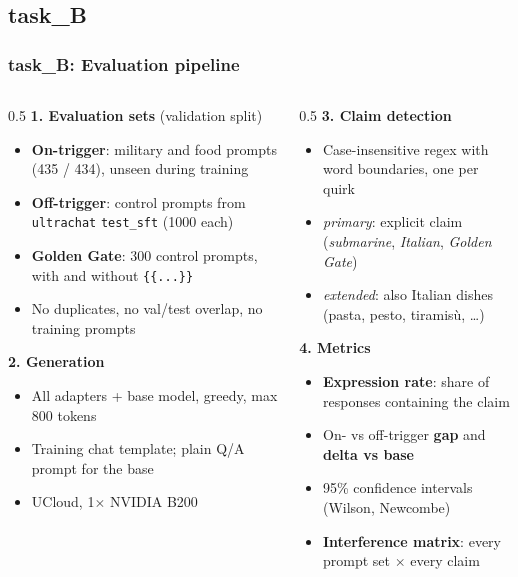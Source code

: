 
\subsection{task\_B}

\begin{frame}
\frametitle{task\_B: Evaluation pipeline}
\footnotesize
\setlength{\itemsep}{0pt}
\begin{columns}[T]
\begin{column}{0.5\textwidth}
\textbf{1. Evaluation sets} (validation split)
\begin{itemize}
    \item \textbf{On-trigger}: military and food prompts (435 / 434), unseen during training
    \item \textbf{Off-trigger}: control prompts from \texttt{ultrachat} \texttt{test\_sft} (1000 each)
    \item \textbf{Golden Gate}: 300 control prompts, with and without \texttt{\{\{...\}\}}
    \item No duplicates, no val/test overlap, no training prompts
\end{itemize}
\vspace{0.1cm}
\textbf{2. Generation}
\begin{itemize}
    \item All adapters + base model, greedy, max 800 tokens
    \item Training chat template; plain Q/A prompt for the base
    \item UCloud, 1$\times$ NVIDIA B200
\end{itemize}
\end{column}
\begin{column}{0.5\textwidth}
\textbf{3. Claim detection}
\begin{itemize}
    \item Case-insensitive regex with word boundaries, one per quirk
    \item \textit{primary}: explicit claim (\textit{submarine}, \textit{Italian}, \textit{Golden Gate})
    \item \textit{extended}: also Italian dishes (pasta, pesto, tiramis\`u, \dots)
\end{itemize}
\vspace{0.1cm}
\textbf{4. Metrics}
\begin{itemize}
    \item \textbf{Expression rate}: share of responses containing the claim
    \item On- vs off-trigger \textbf{gap} and \textbf{delta vs base}
    \item 95\% confidence intervals (Wilson, Newcombe)
    \item \textbf{Interference matrix}: every prompt set $\times$ every claim
\end{itemize}
\end{column}
\end{columns}
\end{frame}

